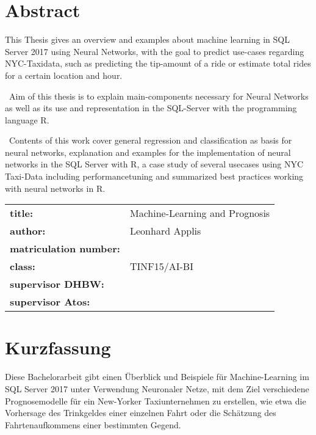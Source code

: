 \chapter*{Abstract} %
This Thesis gives an overview and examples about machine learning in SQL Server 2017 using Neural Networks, with the goal to predict use-cases regarding NYC-Taxidata, such as predicting the tip-amount of a ride or estimate total rides for a certain location and hour.  

~\newline Aim of this thesis is to explain main-components necessary for Neural Networks as well as its use and representation in the SQL-Server with the programming language R. 

~\newline Contents of this work cover general regression and classification as basis for neural networks, explanation and examples for the implementation of neural networks in the SQL Server with R, a case study of several usecases using NYC Taxi-Data including performancetuning and summarized best practices working with neural networks in R. 
~\newline
~\newline
\begin{flushleft}
	\begin{tabular}{ll}
		\textbf{title:} &\quad Machine-Learning and Prognosis \\
		\textbf{author:}  &\quad Leonhard Applis \\
		\textbf{matriculation number:} &\quad 2086307 \\
		\textbf{class:} &\quad TINF15/AI-BI \\
		\textbf{supervisor DHBW:} &\quad \betreuerdhbw \\
		\textbf{supervisor Atos:} & \quad \betreuerfirma \\
		[6ex]%
	\end{tabular} 
\end{flushleft}


\chapter*{Kurzfassung} 
Diese Bachelorarbeit gibt einen Überblick und Beispiele für Machine-Learning im SQL Server 2017 unter Verwendung Neuronaler Netze, mit dem Ziel verschiedene Prognosemodelle für ein New-Yorker Taxiunternehmen zu erstellen, wie etwa die Vorhersage des Trinkgeldes einer einzelnen Fahrt oder die Schätzung des Fahrtenaufkommens einer bestimmten Gegend. 

